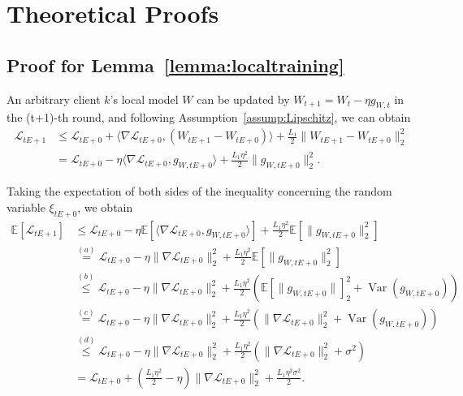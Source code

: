 \documentclass[sigconf]{acmart}
\begin{document}
\section{Theoretical Proofs}\label{app:proof}
\subsection{Proof for Lemma~\ref{lemma:localtraining}}
An arbitrary client $k$'s local model $W$ can be updated by $W_{t+1}=W_t-\eta g_{W,t}$ in the (t+1)-th round, and following Assumption~\ref{assump:Lipschitz}, we can obtain
\begin{equation}
\begin{aligned}
 \mathcal{L}_{t E+1} &\leq \mathcal{L}_{t E+0}+\langle\nabla \mathcal{L}_{t E+0},(W_{t E+1}-W_{t E+0})\rangle+\frac{L_1}{2}\|W_{t E+1}-W_{t E+0}\|_2^2 \\
& =\mathcal{L}_{t E+0}-\eta\langle\nabla \mathcal{L}_{t E+0}, g_{W, t E+0}\rangle+\frac{L_1 \eta^2}{2}\|g_{W, t E+0}\|_2^2 .   
\end{aligned}
\end{equation}

Taking the expectation of both sides of the inequality concerning the random variable $\xi_{tE+0}$, we obtain
\begin{equation}
\begin{aligned}
 \mathbb{E}[\mathcal{L}_{t E+1}] &\leq \mathcal{L}_{t E+0}-\eta \mathbb{E}[\langle\nabla \mathcal{L}_{t E+0}, g_{W, t E+0}\rangle]+\frac{L_1 \eta^2}{2} \mathbb{E}[\|g_{W, t E+0}\|_2^2] \\
& \stackrel{(a)}{=} \mathcal{L}_{t E+0}-\eta\|\nabla \mathcal{L}_{t E+0}\|_2^2+\frac{L_1 \eta^2}{2} \mathbb{E}[\|g_{W, t E+0}\|_2^2] \\
& \stackrel{(b)}{\leq} \mathcal{L}_{t E+0}-\eta\|\nabla \mathcal{L}_{t E+0}\|_2^2+\frac{L_1 \eta^2}{2}(\mathbb{E}[\|g_{W, t E+0}\|]_2^2+\operatorname{Var}(g_{W, t E+0})) \\
& \stackrel{(c)}{=} \mathcal{L}_{t E+0}-\eta\|\nabla \mathcal{L}_{t E+0}\|_2^2+\frac{L_1 \eta^2}{2}(\|\nabla \mathcal{L}_{t E+0}\|_2^2+\operatorname{Var}(g_{W, t E+0})) \\
& \stackrel{(d)}{\leq} \mathcal{L}_{t E+0}-\eta\|\nabla \mathcal{L}_{t E+0}\|_2^2+\frac{L_1 \eta^2}{2}(\|\nabla \mathcal{L}_{t E+0}\|_2^2+\sigma^2) \\
& =\mathcal{L}_{t E+0}+(\frac{L_1 \eta^2}{2}-\eta)\|\nabla \mathcal{L}_{t E+0}\|_2^2+\frac{L_1 \eta^2 \sigma^2}{2}.
\end{aligned}
\end{equation}
\end{document}
